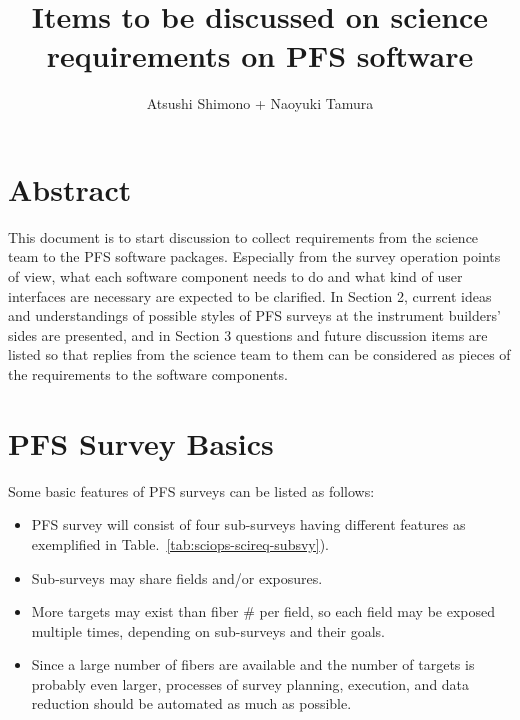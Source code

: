 \documentclass[a4paper,notitlepage]{article}
\title{Items to be discussed on science requirements on PFS software}
\author{Atsushi Shimono + Naoyuki Tamura}
\begin{document}

\ssnhead

\section{Abstract}

This document is to start discussion to collect requirements from the
science team to the PFS software packages. Especially from the survey
operation points of view, what each software component needs to do and
what kind of user interfaces are necessary are expected to be
clarified. In Section 2, current ideas and understandings of possible
styles of PFS surveys at the instrument builders' sides are presented,
and in Section 3 questions and future discussion items are listed so
that replies from the science team to them can be considered as pieces
of the requirements to the software components.

\section{PFS Survey Basics}

Some basic features of PFS surveys can be listed as follows:
\begin{itemize}
 \item PFS survey will consist of four sub-surveys having different
       features as exemplified in
       Table.~\ref{tab:sciops-scireq-subsvy}).
 \item Sub-surveys may share fields and/or exposures.
 \item More targets may exist than fiber \# per field, so each field
       may be exposed multiple times, depending on sub-surveys and
       their goals.
 \item Since a large number of fibers are available and the number of
       targets is probably even larger, processes of survey planning,
       execution, and data reduction should be automated as much as
       possible.
\end{itemize}
\end{document}
